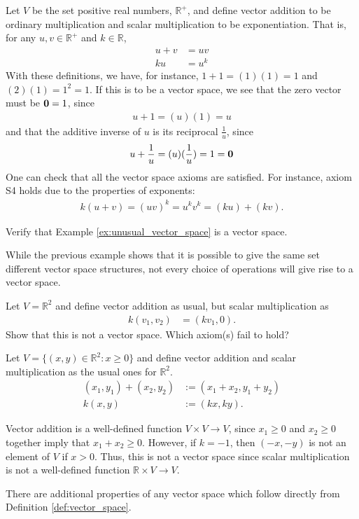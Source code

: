 \documentclass[12pt,letterpaper,reqno]{article}
\numberwithin{equation}{section}
\begin{document}
\begin{example}\label{ex:unusual_vector_space}
	Let $V$ be the set positive real numbers, $\mathbb{R}^+$, and define vector addition to be ordinary multiplication and scalar multiplication to be exponentiation. That is, for any $u,v \in \mathbb{R}^+$ and $k \in \mathbb{R}$,
	\begin{align*}
		u+v&=uv \\
		ku&=u^k 
	\end{align*}
	With these definitions, we have, for instance, $1+1=(1)(1)=1$ and $(2)(1)=1^2=1$. If this is to be a vector space, we see that the zero vector must be ${\bf 0}=1$, since 
	\begin{align*}
		u+1=(u)(1)=u
	\end{align*}
	and that the additive inverse of $u$ is its reciprocal $\frac{1}{u}$, since
	\begin{align*}
		u+\frac{1}{u}=(u)(\frac{1}{u})=1={\bf 0}
	\end{align*}
One can check that all the vector space axioms are satisfied. For instance, axiom S4 holds due to the properties of exponents:
\begin{align*}
	k(u+v)=(uv)^k=u^kv^k=(ku)+(kv).
\end{align*}
\end{example}

\begin{exercise}
	Verify that Example \ref{ex:unusual_vector_space} is a vector space.
\end{exercise}

While the previous example shows that it is possible to give the same set different vector space structures, not every choice of operations will give rise to a vector space.

\begin{exercise}
Let $V=\mathbb{R}^2$ and define vector addition as usual, but scalar multiplication as 
\begin{align*}
	k(v_1,v_2)&=(kv_1,0).
\end{align*}	
Show that this is not a vector space. Which axiom(s) fail to hold?
\end{exercise}

\begin{example}
Let $V=\{(x,y) \in \mathbb{R}^2:x \geq 0\}$ and define vector addition and scalar multiplication as the usual ones for $\mathbb{R}^2$. 
\begin{align*}
	(x_1,y_1)+(x_2,y_2)&:=(x_1+x_2,y_1+y_2) \\
	k(x,y)&:=(kx,ky).
\end{align*}

Vector addition is a well-defined function $V \times V \to V$, since $x_1 \geq 0$ and $x_2 \geq 0$ together imply that $x_1+x_2 \geq 0$. However, if $k=-1$, then $(-x,-y)$ is not an element of $V$ if $x>0$. Thus, this is not a vector space since scalar multiplication is not a well-defined function $\mathbb{R} \times V \to V$.
\end{example}
There are additional properties of any vector space which follow directly from Definition \ref{def:vector_space}.
\end{document}
